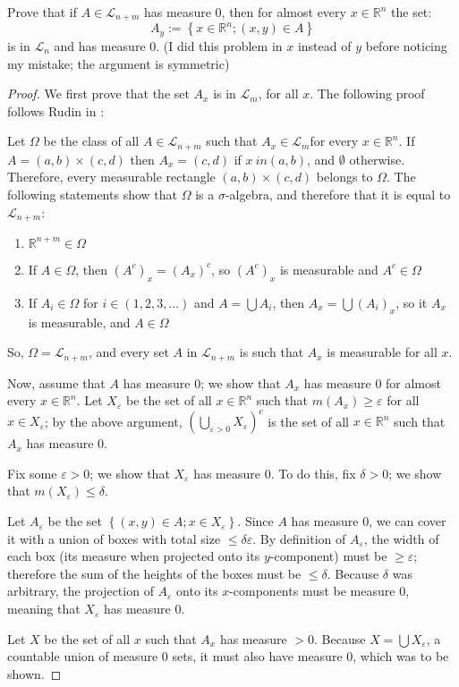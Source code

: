 \documentclass[12pt]{article}
\newcommand{\R}{\mathbb{R}}
\theoremstyle{definition}
\newenvironment{problem}[2][Problem]{\begin{trivlist}
\item[\hskip \labelsep {\bfseries #1}\hskip \labelsep {\bfseries #2.}]}{\end{trivlist}}
\begin{document}
\begin{problem}{2}
	Prove that if $A \in \mathcal{L}_{n+m}$ has measure $0$, then for almost every $x \in \R^{n}$ the set:
	\[ A_{y}:= \left\{ x \in \R^n; (x, y) \in A \right\}\] 
	is in $\mathcal{L}_n$ and has measure $0$. (I did this problem in $x$ instead of $y$ before noticing my mistake; the argument is symmetric)
	\begin{proof}
		We first prove that the set $A_x$ is in $\mathcal{L}_m$, for all $x$. The following proof follows Rudin in \cite{rudin}:
		\par Let $\Omega$ be the class of all $A \in \mathcal{L}_{n+m}$ such that $A_x \in \mathcal{L}_m$for every $x \in \R^n$. If $A = (a,b) \times (c,d)$ then $A_x = (c,d)$ if $x \ in (a,b)$, and $\emptyset$ otherwise. Therefore, every measurable rectangle $(a,b) \times (c,d)$ belongs to $\Omega$. The following statements show that $\Omega$ is a $\sigma$-algebra, and therefore that it is equal to $\mathcal{L}_{n+m}$:
		\begin{enumerate}[label=(\alph*)]
			\item $\R^{n+m} \in \Omega$
			\item If $A \in \Omega$, then $(A^c)_x = (A_x)^c$, so $(A^c)_x$ is measurable and $A^c \in \Omega$
			\item If $A_i \in \Omega$ for $i \in (1,2,3,\dots)$ and $A = \bigcup A_i$, then $A_x = \bigcup (A_i)_x$, so it $A_x$ is measurable, and $A \in \Omega$
		\end{enumerate}
		So, $\Omega = \mathcal{L}_{n+m}$, and every set $A$ in $\mathcal{L}_{n+m}$ is such that $A_x$ is measurable for all $x$.
		\par Now, assume that $A$ has measure $0$; we show that $A_x$ has measure $0$ for almost every $x \in \R^n$. Let $X_\varepsilon$ be the set of all $x \in \R^n$ such that $m(A_x) \geq \varepsilon$ for all $x \in X_\varepsilon$; by the above argument, $\left( \bigcup_{\varepsilon > 0} X_\varepsilon \right)^c$ is the set of all $x \in \R^n$ such that $A_x$ has measure $0$.
		\par Fix some $\varepsilon > 0$; we show that $X_\varepsilon$ has measure $0$. To do this, fix $\delta > 0$; we show that $m(X_\varepsilon) \leq \delta$. 
		\par Let $A_\varepsilon$ be the set $\left\{ (x,y) \in A; x \in X_\varepsilon \right\}$. Since $A$ has measure $0$, we can cover it with a union of boxes with total size $\leq \delta\varepsilon$. By definition of $A_\varepsilon$, the width of each box (its measure when projected onto its $y$-component) must be $\geq \varepsilon$; therefore the sum of the heights of the boxes must be $\leq \delta$. Because $\delta$ was arbitrary, the projection of $A_\varepsilon$ onto its $x$-components must be measure $0$, meaning that $X_\varepsilon$ has measure $0$.
		\par Let $X$ be the set of all $x$ such that $A_x$ has measure $> 0$. Because $X = \bigcup X_\varepsilon$, a countable union of measure $0$ sets, it must also have measure $0$, which was to be shown.
	\end{proof}
\end{problem}
\end{document}
